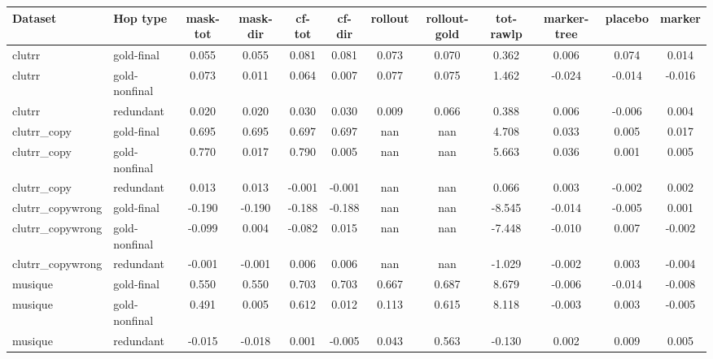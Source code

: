 \begin{tabular}{llcccccccccc}
\toprule
Dataset & Hop type & mask-tot & mask-dir & cf-tot & cf-dir & rollout & rollout-gold & tot-rawlp & marker-tree & placebo & marker \\
\midrule
clutrr & gold-final & 0.055 & 0.055 & 0.081 & 0.081 & 0.073 & 0.070 & 0.362 & 0.006 & 0.074 & 0.014 \\
clutrr & gold-nonfinal & 0.073 & 0.011 & 0.064 & 0.007 & 0.077 & 0.075 & 1.462 & -0.024 & -0.014 & -0.016 \\
clutrr & redundant & 0.020 & 0.020 & 0.030 & 0.030 & 0.009 & 0.066 & 0.388 & 0.006 & -0.006 & 0.004 \\
clutrr\_copy & gold-final & 0.695 & 0.695 & 0.697 & 0.697 & nan & nan & 4.708 & 0.033 & 0.005 & 0.017 \\
clutrr\_copy & gold-nonfinal & 0.770 & 0.017 & 0.790 & 0.005 & nan & nan & 5.663 & 0.036 & 0.001 & 0.005 \\
clutrr\_copy & redundant & 0.013 & 0.013 & -0.001 & -0.001 & nan & nan & 0.066 & 0.003 & -0.002 & 0.002 \\
clutrr\_copywrong & gold-final & -0.190 & -0.190 & -0.188 & -0.188 & nan & nan & -8.545 & -0.014 & -0.005 & 0.001 \\
clutrr\_copywrong & gold-nonfinal & -0.099 & 0.004 & -0.082 & 0.015 & nan & nan & -7.448 & -0.010 & 0.007 & -0.002 \\
clutrr\_copywrong & redundant & -0.001 & -0.001 & 0.006 & 0.006 & nan & nan & -1.029 & -0.002 & 0.003 & -0.004 \\
musique & gold-final & 0.550 & 0.550 & 0.703 & 0.703 & 0.667 & 0.687 & 8.679 & -0.006 & -0.014 & -0.008 \\
musique & gold-nonfinal & 0.491 & 0.005 & 0.612 & 0.012 & 0.113 & 0.615 & 8.118 & -0.003 & 0.003 & -0.005 \\
musique & redundant & -0.015 & -0.018 & 0.001 & -0.005 & 0.043 & 0.563 & -0.130 & 0.002 & 0.009 & 0.005 \\
\bottomrule
\end{tabular}
